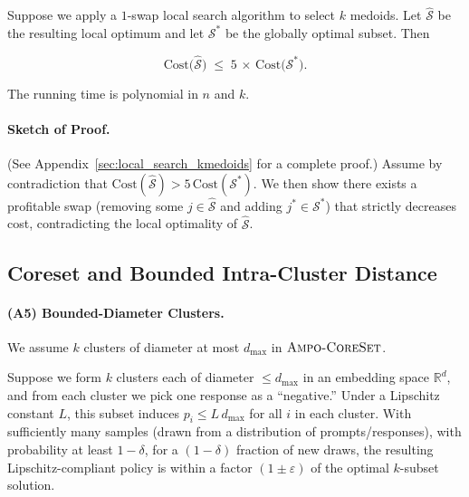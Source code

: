 \vspace{-0.1in}
\begin{theorem}
\label{thm:local_search_main}
Suppose we apply a $1$-swap local search algorithm to select $k$ medoids. Let $\widehat{\mathcal{S}}$ be the resulting local optimum and let $\mathcal{S}^*$ be the globally optimal subset. Then

\vspace{-0.1in}
\[
  \mathrm{Cost}\bigl(\widehat{\mathcal{S}}\bigr)
  \;\le\;
  5
  \,\times\,
  \mathrm{Cost}\bigl(\mathcal{S}^*\bigr).
\]
\end{theorem}
\vspace{-0.15in}
The running time is polynomial in $n$ and $k$. 

\vspace{-0.15in}
\paragraph{Sketch of Proof.}
(See Appendix~\ref{sec:local_search_kmedoids} for a complete proof.) Assume by contradiction that $\mathrm{Cost}(\widehat{\mathcal{S}}) > 5\, \mathrm{Cost}(\mathcal{S}^*)$. We then show there exists a profitable swap (removing some $j\in\widehat{\mathcal{S}}$ and adding $j^*\in\mathcal{S}^*$) that strictly decreases cost, contradicting the local optimality of $\widehat{\mathcal{S}}$.

\vspace{-0.05in}
\subsection{Coreset and Bounded Intra-Cluster Distance}
\label{subsec:coreset_bounded_statement}

\vspace{-0.05in}
\paragraph{(A5) Bounded-Diameter Clusters.}
We assume $k$ clusters of diameter at most $d_{\max}$ in $\textsc{Ampo-CoreSet}$.

\begin{theorem}
\label{thm:coreset_main}
Suppose we form $k$ clusters each of diameter $\le d_{\max}$ in an embedding space $\mathbb{R}^d$, and from each cluster we pick one response as a “negative.” Under a Lipschitz constant $L$, this subset induces $p_i \le L\,d_{\max}$ for all $i$ in each cluster. With sufficiently many samples (drawn from a distribution of prompts/responses), with probability at least $1-\delta$, for a $(1-\delta)$ fraction of new draws, the resulting Lipschitz-compliant policy is within a factor $(1\pm \varepsilon)$ of the optimal $k$-subset solution.
\end{theorem}

